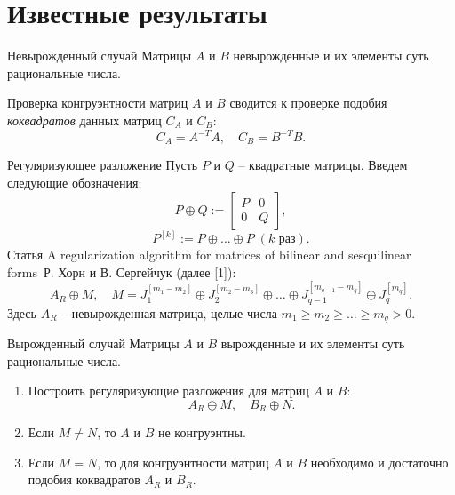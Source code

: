 \documentclass[10pt,pdf,hyperref={unicode}]{beamer}
\begin{document}
\section{Известные результаты}
\begin{frame}{Невырожденный случай}
    Матрицы $A$ и $B$ невырожденные и их элементы суть рациональные числа. \newline
    
    Проверка конгруэнтности матриц $A$ и $B$ сводится к проверке подобия \textit{коквадратов} данных матриц $C_A$ и $C_B$:
    \begin{equation*}
        C_A = A^{-T}A, \quad C_B = B^{-T}B.
    \end{equation*}
\end{frame}
\begin{frame}{Регуляризующее разложение}
    Пусть $P$ и $Q$ -- квадратные матрицы. Введем следующие обозначения:
    \begin{equation*}
        P \oplus Q := \left[\begin{array}{c|c} 
            P & 0 \\ 
            \hline 
            0 & Q 
        \end{array}\right],
    \end{equation*}
    \begin{equation*}
        P^{[k]} := P \oplus \dots \oplus P \;(k \text{ раз}).
    \end{equation*}
    \newline
    Статья \guillemotleft A regularization algorithm for matrices of bilinear and sesquilinear forms\guillemotright~Р. Хорн и В. Сергейчук (далее [1]):
    \begin{equation*}
        A_R \oplus M,\quad M = J_1^{[m_1-m_2]} \oplus J_2^{[m_2-m_3]} \oplus \dots \oplus J_{q-1}^{[m_{q-1}-m_q]} \oplus J_q^{[m_q]}.
    \end{equation*}
    Здесь $A_R$ -- невырожденная матрица, целые числа  $m_1 \geq m_2 \geq \dots \geq m_q > 0$.
\end{frame}
\begin{frame}{Вырожденный случай}
    Матрицы $A$ и $B$ вырожденные и их элементы суть рациональные числа.
    \begin{enumerate}
        \item Построить регуляризующие разложения для матриц $A$ и $B$:
        \begin{equation*}
            A_R \oplus M, \quad B_R \oplus N.
        \end{equation*}
        \item Если $M \neq N$, то $A$ и $B$ не конгруэнтны.
        \item Если $M = N$, то для конгруэнтности матриц $A$ и $B$ необходимо и достаточно подобия коквадратов $A_R$ и $B_R$.
    \end{enumerate}
\end{frame}
\end{document}

